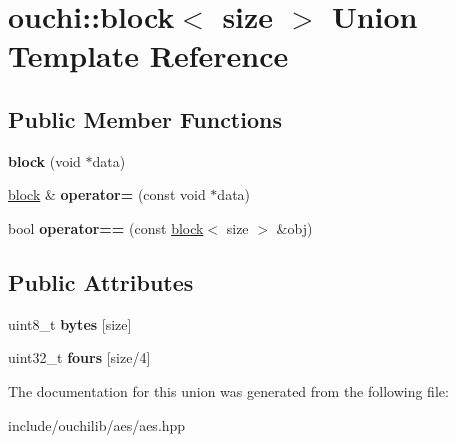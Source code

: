 \hypertarget{unionouchi_1_1block}{}\section{ouchi\+::block$<$ size $>$ Union Template Reference}
\label{unionouchi_1_1block}
\subsection*{Public Member Functions}
\begin{DoxyCompactItemize}
\item 
\mbox{\label{unionouchi_1_1block_af87b70ed916e92b9b342498fc39056f4}} 
{\bfseries block} (void $\ast$data)
\item 
\mbox{\label{unionouchi_1_1block_a34bc9755f7a38eb5facbcff597421b09}} 
\mbox{\hyperlink{unionouchi_1_1block}{block}} \& {\bfseries operator=} (const void $\ast$data)
\item 
\mbox{\label{unionouchi_1_1block_a9791515d93fe44cca97931726ad67a04}} 
bool {\bfseries operator==} (const \mbox{\hyperlink{unionouchi_1_1block}{block}}$<$ size $>$ \&obj)
\end{DoxyCompactItemize}
\subsection*{Public Attributes}
\begin{DoxyCompactItemize}
\item 
\mbox{\label{unionouchi_1_1block_a74579265e152b34598e59864f2e53346}} 
uint8\+\_\+t {\bfseries bytes} \mbox{[}size\mbox{]}
\item 
\mbox{\label{unionouchi_1_1block_a1ba1413c3209d7f07d84b089a2272688}} 
uint32\+\_\+t {\bfseries fours} \mbox{[}size/4\mbox{]}
\end{DoxyCompactItemize}


The documentation for this union was generated from the following file\+:\begin{DoxyCompactItemize}
\item 
include/ouchilib/aes/aes.\+hpp\end{DoxyCompactItemize}
